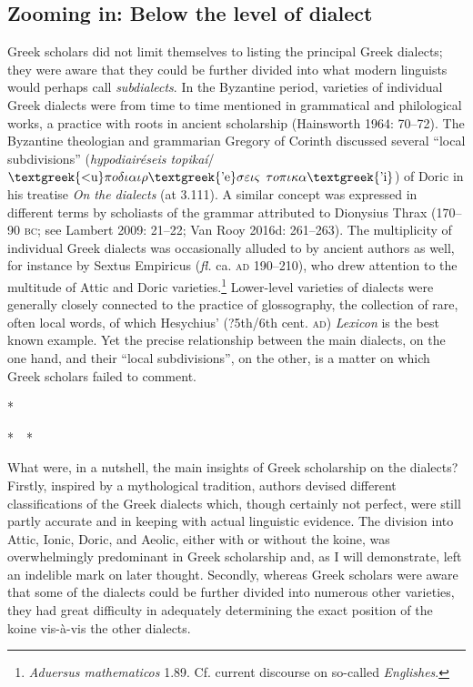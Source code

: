 \subsection{Zooming in: Below the level of dialect}
\hypertarget{Toc19704810}{}\begin{styleStandard}
Greek scholars did not limit themselves to listing the principal Greek dialects; they were aware that they could be further divided into what modern linguists would perhaps call \textit{subdialects}. In the Byzantine period, varieties of individual Greek dialects were from time to time mentioned in grammatical and philological works, a practice with roots in ancient scholarship (Hainsworth 1964: 70–72). The Byzantine theologian and grammarian Gregory of Corinth discussed several “local subdivisions” (\textit{hypodiairéseis topikaí}/$\text{\textgreek{<u}}\pi o\delta \iota \alpha \iota \rho \text{\textgreek{'e}}\sigma \varepsilon \iota \varsigma $ $\tau o\pi \iota \kappa \alpha \text{\textgreek{'i}}$) of Doric in his treatise \textit{On the dialects} (at 3.111). A similar concept was expressed in different terms by scholiasts of the grammar attributed to Dionysius Thrax (170–90 \textsc{bc}; see Lambert 2009: 21–22; Van Rooy 2016d: 261–263). The multiplicity of individual Greek dialects was occasionally alluded to by ancient authors as well, for instance by Sextus Empiricus (\textit{fl.} ca. \textsc{ad} 190–210), who drew attention to the multitude of Attic and Doric varieties.\footnote{ \textit{Aduersus mathematicos} 1.89. Cf. current discourse on so-called \textit{Englishes}.} Lower-level varieties of dialects were generally closely connected to the practice of glossography, the collection of rare, often local words, of which Hesychius’ (?5th/6th cent. \textsc{ad}) \textit{Lexicon} is the best known example. Yet the precise relationship between the main dialects, on the one hand, and their “local subdivisions”, on the other, is a matter on which Greek scholars failed to comment.
\end{styleStandard}

\begin{styleStandard}
*
\end{styleStandard}

\begin{styleStandard}
*\ \ *
\end{styleStandard}

\begin{styleStandard}
What were, in a nutshell, the main insights of Greek scholarship on the dialects? Firstly, inspired by a mythological tradition, authors devised different classifications of the Greek dialects which, though certainly not perfect, were still partly accurate and in keeping with actual linguistic evidence. The division into Attic, Ionic, Doric, and Aeolic, either with or without the koine, was overwhelmingly predominant in Greek scholarship and, as I will demonstrate, left an indelible mark on later thought. Secondly, whereas Greek scholars were aware that some of the dialects could be further divided into numerous other varieties, they had great difficulty in adequately determining the exact position of the koine vis-à-vis the other dialects.
\end{styleStandard}

